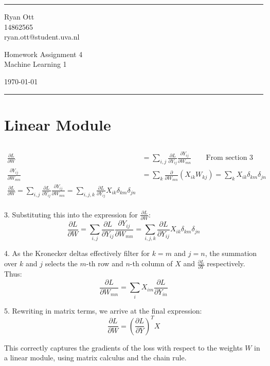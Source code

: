 \documentclass[a4paper]{article}
\begin{document}

\fancyhead[C]{}
\hrule \medskip %
\begin{minipage}{0.295\textwidth} 
\raggedright
\footnotesize
Ryan Ott \hfill\\   
14862565 \hfill\\
ryan.ott@student.uva.nl
\end{minipage}
\begin{minipage}{0.4\textwidth} 
\centering 
\large 
Homework Assignment 4\\ 
\normalsize 
Machine Learning 1\\ 
\end{minipage}
\begin{minipage}{0.295\textwidth} 
\raggedleft
\today\hfill\\
\end{minipage}
\medskip\hrule 
\bigskip

\section{Linear Module}
\subsection{} %
\begin{align}
    \frac{\partial L}{\partial W} &= \sum_{i,j}^{} \frac{\partial L}{\partial Y_{ij}} \frac{\partial Y_{ij}}{\partial W_{mn}} \quad\quad \text{From section 3} \\
    \frac{\partial Y_{ij}}{\partial W_{mn}} &= \sum_{k} \frac{\partial}{\partial W_{mn}} (X_{ik} W_{kj}) = \sum_{k} X_{ik} \delta_{km} \delta_{jn} \\
    \frac{\partial L}{\partial W} = \sum_{i,j} \frac{\partial L}{\partial Y_{ij}} \frac{\partial Y_{ij}}{\partial W_{mn}} = \sum_{i,j,k} \frac{\partial L}{\partial Y_{ij}} X_{ik} \delta_{km} \delta_{jn} \\
    
\end{align}


3. Substituting this into the expression for \( \frac{\partial L}{\partial W} \):
   \[ \frac{\partial L}{\partial W} = \sum_{i,j} \frac{\partial L}{\partial Y_{ij}} \frac{\partial Y_{ij}}{\partial W_{mn}} = \sum_{i,j,k} \frac{\partial L}{\partial Y_{ij}} X_{ik} \delta_{km} \delta_{jn} \]

4. As the Kronecker deltas effectively filter for \( k = m \) and \( j = n \), the summation over \( k \) and \( j \) selects the \( m \)-th row and \( n \)-th column of \( X \) and \( \frac{\partial L}{\partial Y} \) respectively. Thus:
   \[ \frac{\partial L}{\partial W_{mn}} = \sum_{i} X_{im} \frac{\partial L}{\partial Y_{in}} \]

5. Rewriting in matrix terms, we arrive at the final expression:
   \[ \frac{\partial L}{\partial W} = \left( \frac{\partial L}{\partial Y} \right)^T X \]

This correctly captures the gradients of the loss with respect to the weights \( W \) in a linear module, using matrix calculus and the chain rule.
\end{document}
